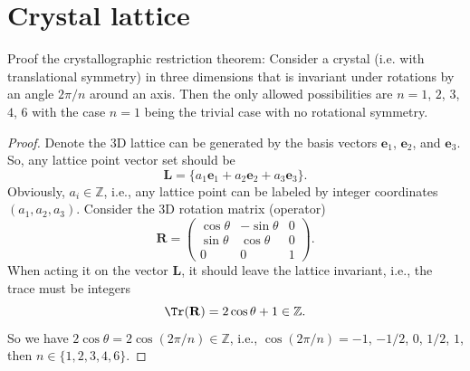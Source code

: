 
\section{Crystal lattice}

\begin{problem}
  Proof the crystallographic restriction theorem: Consider a crystal (i.e. with
  translational symmetry) in three dimensions that is invariant under rotations
  by an angle $2\pi/n$ around an axis. Then the only allowed possibilities are
  $n = 1$, $2$, $3$, $4$, $6$ with the case $n = 1$ being the trivial case
  with no rotational symmetry.
\end{problem}
\begin{solution}\begin{proof}
  Denote the 3D lattice can be generated by the basis vectors
  $\bm e_1$, $\bm e_2$, and $\bm e_3$.
  So, any lattice point vector set should be
  \[
    \bm L = \{a_1 \bm e_1 + a_2 \bm e_2 + a_3 \bm e_3\}.
  \]
  Obviously, $a_i \in \mathbb Z$, i.e., any lattice point can be labeled
  by integer coordinates $(a_1, a_2, a_3)$.
  Consider the 3D rotation matrix (operator)
  \[
    \mathbf R = \begin{pmatrix}
      \cos\theta & -\sin\theta & 0\\
      \sin\theta & \cos\theta & 0\\
      0 & 0 & 1
    \end{pmatrix}.
  \]
  When acting it on the vector $\bm L$, it should leave the lattice invariant,
  i.e., the trace must be integers
  \[
    \Tr(\mathbf R) = 2\cos\theta + 1 \in \mathbb Z.
  \]
  So we have $2\cos\theta = 2\cos(2\pi/n) \in \mathbb Z$, i.e.,
  $\cos(2\pi/n) = -1$, $-1/2$, $0$, $1/2$, $1$, then $n \in \{1,2,3,4,6\}$.
\end{proof}
\end{solution}

